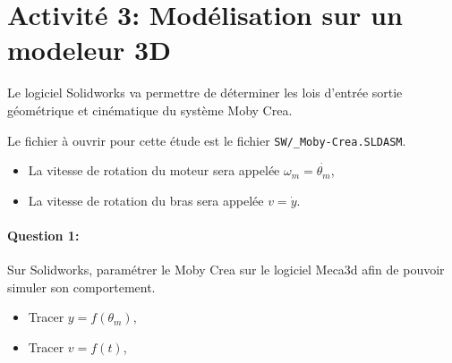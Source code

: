 \section{Activité 3: Modélisation sur un modeleur 3D}

Le logiciel Solidworks va permettre de déterminer les lois d'entrée sortie géométrique et cinématique du système Moby Crea.

Le fichier à ouvrir pour cette étude est le fichier \verb?SW/_Moby-Crea.SLDASM?.

\begin{itemize}
 \item La vitesse de rotation du moteur sera appelée $\omega_m=\dot{\theta_m}$,
 \item La vitesse de rotation du bras sera appelée $v=\dot{y}$.
\end{itemize}

\paragraph{Question 1:} Sur Solidworks, paramétrer le Moby Crea sur le logiciel Meca3d afin de pouvoir simuler son comportement.
 
\begin{itemize}
 \item Tracer $y=f(\theta_m)$,
 \item Tracer $v=f(t)$,
\end{itemize}

%
%
%

